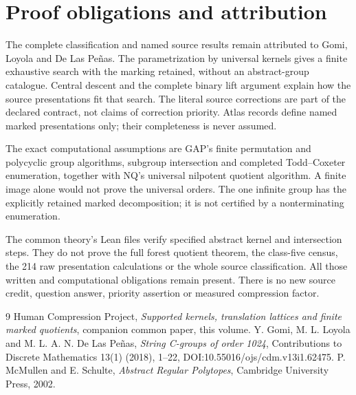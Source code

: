 \section{Proof obligations and attribution}
The complete classification and named source results remain attributed
to Gomi, Loyola and De Las Pe\~nas. The parametrization by universal kernels gives a finite exhaustive
search with the marking retained, without an abstract-group catalogue. Central descent and the complete binary lift
argument explain how the source presentations fit that search. The
literal source corrections are part of the declared contract, not
claims of correction priority. Atlas records define named marked
presentations only; their completeness is never assumed.

The exact computational assumptions are GAP's finite permutation and
polycyclic group algorithms, subgroup intersection and completed
Todd--Coxeter enumeration, together with NQ's universal nilpotent
quotient algorithm. A finite image alone would not prove the universal
orders. The one infinite group has the explicitly retained marked
decomposition; it is not certified by a nonterminating enumeration.

The common theory's Lean files verify specified abstract kernel and
intersection steps. They do not prove the full forest quotient theorem,
the class-five census, the 214 raw presentation calculations or the
whole source classification. All those written and computational
obligations remain present. There is no new source credit, question
answer, priority assertion or measured compression factor.

\begin{thebibliography}{9}
 Human Compression Project, \emph{Supported kernels, translation lattices and finite marked quotients}, companion common paper, this volume.
 Y. Gomi, M. L. Loyola and M. L. A. N. De Las Pe\~nas,
\emph{String C-groups of order 1024}, Contributions to Discrete
Mathematics 13(1) (2018), 1--22, DOI:10.55016/ojs/cdm.v13i1.62475.
 P. McMullen and E. Schulte, \emph{Abstract Regular
Polytopes}, Cambridge University Press, 2002.
\end{thebibliography}


